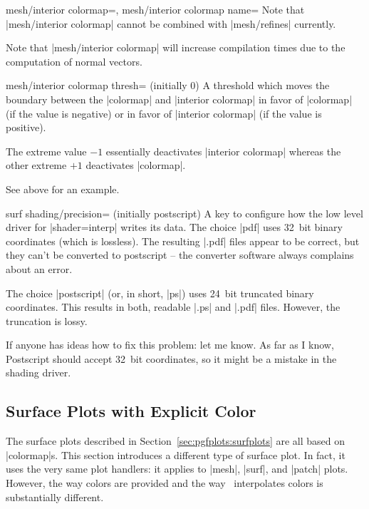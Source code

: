{{\begin{pgfplotskeylist}{%
	mesh/interior colormap=,%
	mesh/interior colormap name=}
	Note that |mesh/interior colormap| cannot be combined with |mesh/refines| currently.
	
	Note that |mesh/interior colormap| will increase compilation times due to the computation of normal vectors.
\end{pgfplotskeylist}

\begin{pgfplotskey}{mesh/interior colormap thresh= (initially 0)}
	A threshold which moves the boundary between the |colormap| and |interior colormap| in favor of |colormap| (if the value is negative) or in favor of |interior colormap| (if the value is positive). 
	
	The extreme value $-1$ essentially deactivates |interior colormap| whereas the other extreme $+1$ deactivates |colormap|.

	See above for an example.
\end{pgfplotskey}
}%

\begin{pgfplotskey}{surf shading/precision= (initially postscript)}
	A key to configure how the low level driver for |shader=interp| writes its data. The choice |pdf| uses 32~bit binary coordinates (which is lossless). The resulting |.pdf| files appear to be correct, but they can't be converted to postscript -- the converter software always complains about an error. 

	The choice |postscript| (or, in short, |ps|) uses 24~bit truncated binary coordinates. This results in both, readable |.ps| and |.pdf| files. However, the truncation is lossy.

	If anyone has ideas how to fix this problem: let me know. As far as I know, Postscript should accept 32~bit coordinates, so it might be a mistake in the shading driver.
\end{pgfplotskey}

\subsection{Surface Plots with Explicit Color}
{%
%
%

The surface plots described in Section~\ref{sec:pgfplots:surfplots} are all based on |colormap|s. This section introduces a different type of surface plot. In fact, it uses the very same plot handlers: it applies to |mesh|, |surf|, and |patch| plots. However, the way colors are provided and the way \PGFPlots\ interpolates colors is substantially different. 

}}
